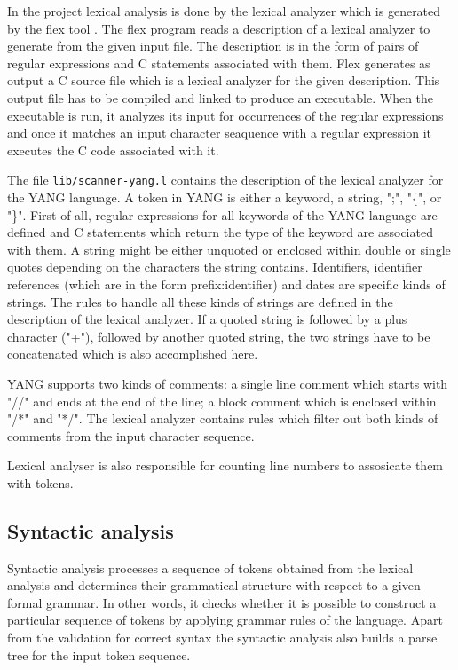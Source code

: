 \documentclass[conference]{IEEEtran}
\begin{document}
In the project lexical analysis is done by the lexical analyzer which is generated by the flex tool \cite{bib5}. The flex program reads a description of a lexical analyzer to generate from the given input file. The description is in the form of pairs of regular expressions and C statements associated with them. Flex generates as output a C source file which is a lexical analyzer for the given description. This output file has to be compiled and linked to produce an executable. When the executable is run, it analyzes its input for occurrences of the regular expressions and once it matches an input character seaquence with a regular expression it executes the C code associated with it.

The file \texttt{lib/scanner-yang.l} contains the description of the lexical analyzer for the YANG language. A token in YANG is either a keyword, a string, ";", "\{", or "\}". First of all, regular expressions for all keywords of the YANG language are defined and C statements which return the type of the keyword are associated with them. A string might be either unquoted  or enclosed within double or single quotes depending on the characters the string contains. Identifiers, identifier references (which are in the form prefix:identifier) and dates  are specific kinds of strings. The rules to handle all these kinds of strings are defined in the description of the lexical analyzer. If a quoted string is followed by a plus character ("+"), followed by
 another quoted string, the two strings have to be concatenated which is also accomplished here.

YANG supports two kinds of comments: a single line comment which starts with "//" and  ends at the end of the line; a block comment which is enclosed within "/*"  and "*/". The lexical analyzer contains rules which filter out both kinds of comments from the input character sequence.

Lexical analyser is also responsible for counting line numbers to assosicate them with tokens.

\subsection{Syntactic analysis}
Syntactic analysis processes a sequence of tokens obtained from the lexical analysis and determines their grammatical structure with respect to a given formal grammar. In other words, it checks whether it is possible to construct a particular sequence of tokens by applying grammar rules of the language. Apart from the validation for correct syntax the syntactic analysis also builds a parse tree for the input token sequence. 
\end{document}
